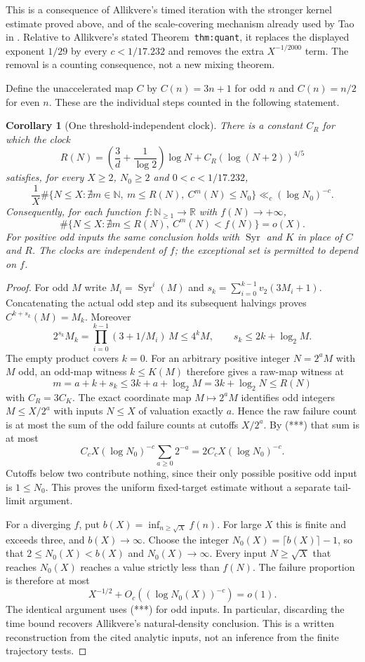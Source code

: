 \documentclass[11pt]{article}
\newtheorem{corollary}[proposition]{Corollary}
\theoremstyle{remark}\newtheorem{remark}[proposition]{Remark}
\newcommand{\NN}{\mathbb N}
\newcommand{\Syr}{\operatorname{Syr}}
\begin{document}
This is a consequence of Allikvere's timed iteration with the stronger
kernel estimate proved above, and of the scale-covering mechanism already
used by Tao in \cite[\S3]{Tao7}. Relative to Allikvere's stated
Theorem~\texttt{thm:quant}, it replaces the displayed exponent $1/29$
by every $c<1/17.232$ and removes the extra $X^{-1/2000}$ term.
The removal is a counting consequence, not a new mixing theorem.

Define the unaccelerated map $C$ by $C(n)=3n+1$ for odd $n$
and $C(n)=n/2$ for even $n$. These are the individual steps counted
in the following statement.

\begin{corollary}[One threshold-independent clock]
\label{cor:universal-clock}
There is a constant $C_R$ for which the clock
\[
 R(N)=\left(\frac3d+\frac1{\log2}\right)\log N
                         +C_R(\log(N+2))^{4/5}
\]
satisfies, for every $X\ge2$, $N_0\ge2$ and $0<c<1/17.232$,
\[
 \frac1X\#\{N\le X:\nexists m\in\NN,\ m\le R(N),\
                       C^m(N)\le N_0\}
              \ll_c(\log N_0)^{-c}.
\]
Consequently, for each function $f:\NN_{\ge1}\to\mathbb R$
with $f(N)\to+\infty$,
\[
 \#\{N\le X:\nexists m\le R(N),\ C^m(N)<f(N)\}=o(X).
\]
For positive odd inputs the same conclusion holds with $\Syr$ and
$K$ in place of $C$ and $R$. The clocks are independent of $f$;
the exceptional set is permitted to depend on $f$.
\end{corollary}
\begin{proof}
For odd $M$ write $M_i=\Syr^i(M)$ and
$s_k=\sum_{i=0}^{k-1}v_2(3M_i+1)$. Concatenating the actual
odd step and its subsequent halvings proves
$C^{k+s_k}(M)=M_k$. Moreover
\[
 2^{s_k}M_k=\prod_{i=0}^{k-1}(3+1/M_i)\,M
              \le4^kM,
 \qquad s_k\le2k+\log_2 M.
\]
The empty product covers $k=0$. For an arbitrary positive integer
$N=2^aM$ with $M$ odd, an odd-map witness $k\le K(M)$ therefore gives
a raw-map witness at
\[
 m=a+k+s_k\le3k+a+\log_2 M=3k+\log_2 N
       \le R(N)
\]
with $C_R=3C_K$. The exact coordinate map
$M\mapsto2^aM$ identifies odd integers $M\le X/2^a$ with inputs
$N\le X$ of valuation exactly $a$. Hence the raw failure count is
at most the sum of the odd failure counts at cutoffs $X/2^a$.
By (***) that sum is at most
\[
 C_cX(\log N_0)^{-c}\sum_{a\ge0}2^{-a}
          =2C_cX(\log N_0)^{-c}.
\]
Cutoffs below two contribute nothing, since their only possible
positive odd input is $1\le N_0$. This proves the uniform fixed-target
estimate without a separate tail-limit argument.

For a diverging $f$, put
$b(X)=\inf_{n\ge\sqrt X}f(n)$. For large $X$ this is finite and
exceeds three, and $b(X)\to\infty$. Choose the integer
$N_0(X)=\lceil b(X)\rceil-1$, so that
$2\le N_0(X)<b(X)$ and $N_0(X)\to\infty$.
Every input $N\ge\sqrt X$ that reaches $N_0(X)$ reaches a value
strictly less than $f(N)$. The failure proportion is therefore at
most
\[
 X^{-1/2}+O_c((\log N_0(X))^{-c})=o(1).
\]
The identical argument uses (***) for odd inputs. In particular,
discarding the time bound recovers Allikvere's natural-density
conclusion. This is a written reconstruction from the cited analytic
inputs, not an inference from the finite trajectory tests.
\end{proof}
\end{document}
